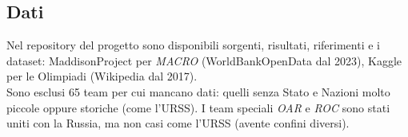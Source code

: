 \subsection{Dati}\label{sec:methods_data}

Nel repository del progetto\cite{our-repo} sono disponibili sorgenti, risultati,
riferimenti e i dataset: MaddisonProject\cite{MaddisonProjectDatabase2024} per
\textit{MACRO}
(WorldBankOpenData\cite{WorldBankOpenGPDpc,WorldBankOpenPOP} dal 2023),
Kaggle\cite{120YearsOlympic} per le Olimpiadi
(Wikipedia\cite{WikipediaOlympics,WikipediaW2018,WikipediaS2020,WikipediaW2022,WikipediaS2024,WikipediaW2026}
dal 2017).\\
Sono esclusi 65 team per cui mancano dati\cite{our-repo_missingTeams}: quelli
senza Stato e Nazioni molto piccole oppure storiche (come l'URSS). I team
speciali \textit{OAR}\cite{WikipediaOAR} e \textit{ROC}\cite{WikipediaROC} sono
stati uniti con la Russia, ma non casi come l'URSS (avente confini diversi).

